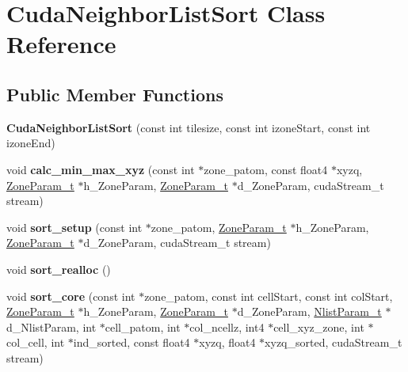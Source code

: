 \hypertarget{classCudaNeighborListSort}{}\section{Cuda\+Neighbor\+List\+Sort Class Reference}
\label{classCudaNeighborListSort}
\subsection*{Public Member Functions}
\begin{DoxyCompactItemize}
\item 
\hypertarget{classCudaNeighborListSort_ab7019676e4e8933befee1bfd5e2e2a6c}{}\label{classCudaNeighborListSort_ab7019676e4e8933befee1bfd5e2e2a6c} 
{\bfseries Cuda\+Neighbor\+List\+Sort} (const int tilesize, const int izone\+Start, const int izone\+End)
\item 
\hypertarget{classCudaNeighborListSort_a7e00d2338c340628ca8a665fc9e6fb39}{}\label{classCudaNeighborListSort_a7e00d2338c340628ca8a665fc9e6fb39} 
void {\bfseries calc\+\_\+min\+\_\+max\+\_\+xyz} (const int $\ast$zone\+\_\+patom, const float4 $\ast$xyzq, \hyperlink{structZoneParam__t}{Zone\+Param\+\_\+t} $\ast$h\+\_\+\+Zone\+Param, \hyperlink{structZoneParam__t}{Zone\+Param\+\_\+t} $\ast$d\+\_\+\+Zone\+Param, cuda\+Stream\+\_\+t stream)
\item 
\hypertarget{classCudaNeighborListSort_a93c27a19a9356ab33355eb5d7bd088ec}{}\label{classCudaNeighborListSort_a93c27a19a9356ab33355eb5d7bd088ec} 
void {\bfseries sort\+\_\+setup} (const int $\ast$zone\+\_\+patom, \hyperlink{structZoneParam__t}{Zone\+Param\+\_\+t} $\ast$h\+\_\+\+Zone\+Param, \hyperlink{structZoneParam__t}{Zone\+Param\+\_\+t} $\ast$d\+\_\+\+Zone\+Param, cuda\+Stream\+\_\+t stream)
\item 
\hypertarget{classCudaNeighborListSort_a58deebb87534d1c6af464a7c645c994e}{}\label{classCudaNeighborListSort_a58deebb87534d1c6af464a7c645c994e} 
void {\bfseries sort\+\_\+realloc} ()
\item 
\hypertarget{classCudaNeighborListSort_a8ca1fc5149e9b047cdf7342b4ed9e8ef}{}\label{classCudaNeighborListSort_a8ca1fc5149e9b047cdf7342b4ed9e8ef} 
void {\bfseries sort\+\_\+core} (const int $\ast$zone\+\_\+patom, const int cell\+Start, const int col\+Start, \hyperlink{structZoneParam__t}{Zone\+Param\+\_\+t} $\ast$h\+\_\+\+Zone\+Param, \hyperlink{structZoneParam__t}{Zone\+Param\+\_\+t} $\ast$d\+\_\+\+Zone\+Param, \hyperlink{structNlistParam__t}{Nlist\+Param\+\_\+t} $\ast$d\+\_\+\+Nlist\+Param, int $\ast$cell\+\_\+patom, int $\ast$col\+\_\+ncellz, int4 $\ast$cell\+\_\+xyz\+\_\+zone, int $\ast$col\+\_\+cell, int $\ast$ind\+\_\+sorted, const float4 $\ast$xyzq, float4 $\ast$xyzq\+\_\+sorted, cuda\+Stream\+\_\+t stream)

\end{DoxyCompactItemize}
